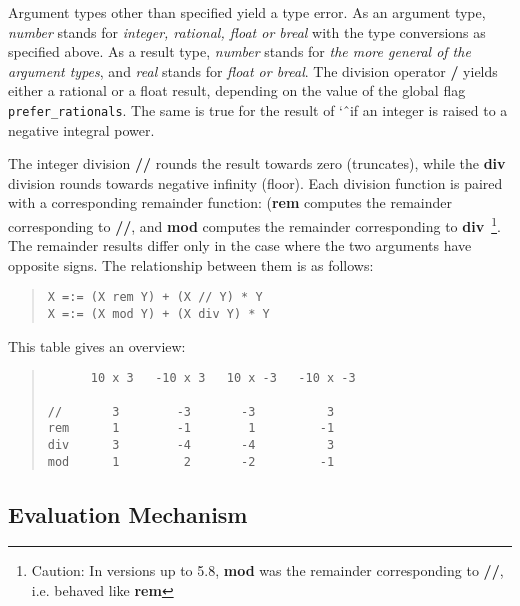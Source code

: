 \noindent
Argument types other than specified yield a type error.
As an argument type, {\it number} stands for {\it integer, rational, float
or breal} with the type conversions as specified above.
As a result type, {\it number} stands for
{\it the more general of the argument types}, and {\it real} stands for
{\it float or breal}.
The division operator {\bf /} yields either a rational or a float result,
depending on the value of the global flag {\tt prefer_rationals}.
The same is true for the result of \char`\^\ if an integer is raised to
a negative integral power.

The integer division {\bf //} rounds the result towards zero (truncates),
while the {\bf div} division rounds towards negative infinity (floor).
Each division function is paired with a corresponding remainder function:
({\bf rem} computes the remainder corresponding to {\bf //}, and {\bf mod}
computes the remainder corresponding to {\bf div}\
\footnote{Caution: In {\eclipse} versions up to 5.8, {\bf mod} was the
remainder corresponding to {\bf //}, i.e. behaved like {\bf rem}}.
The remainder results differ only in the case where the two arguments
have opposite signs.  The relationship between them is as follows:
\begin{quote}\begin{verbatim}
X =:= (X rem Y) + (X // Y) * Y
X =:= (X mod Y) + (X div Y) * Y
\end{verbatim}\end{quote}
This table gives an overview:
\begin{quote}\begin{verbatim}
      10 x 3   -10 x 3   10 x -3   -10 x -3

//       3        -3       -3          3
rem      1        -1        1         -1
div      3        -4       -4          3
mod      1         2       -2         -1
\end{verbatim}\end{quote}

\subsection{Evaluation Mechanism}

